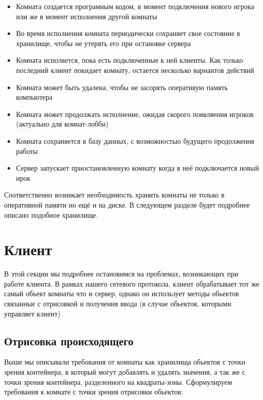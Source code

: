 \documentclass[a4paper,14pt, openany]{book}
\begin{document}
\begin {itemize}
   \item Комната создается програмным кодом, в момент подключения нового игрока или же в момент исполнения другой комнаты
   \item Во время исполнения комната периодически сохраняет свое состояние в хранилище, чтобы не утерять его при остановке сервера
   \item Комната исполяется, пока есть подключенные к ней клиенты. Как только последний клиент покидает комнату, остается несколько вариантов действий
   \item Комната может быть удалена, чтобы не засорять оперативую память компьютера 
   \item Комната может продолжать исполнение, ожидая скорого появляения игроков (актуально для комнат-лобби)
   \item Комната сохраняется в базу данных, с возможностью будущего продолжения работы
   \item Сервер запускает приостановленную комнату когда в неё подключается новый ирок
\end{itemize}

Соответственно возникает необходимость хранить комнаты не только в оперативной памяти но ещё и на диске. В следующем разделе будет подробнее описано подобное хранилище.

\section {Клиент}

В этой секции мы подробнее остановимся на проблемах, возникающих при работе клиента. В рамках нашего сетевого протокола, клиент обрабатывает тот же самый обьект комнаты что и сервер, однако он использует методы обьектов связанные с отрисовкой и получения ввода (в случае обьектов, которыми управляет клиент)

\subsection{Отрисовка происходящего}

Выше мы описывали требования от комнаты как хранилища обьектов с точки зрения контейнера, в который могут добавлять и удалять значения, а так же с точки зрения контейнера, разделенного на квадраты-зоны. Сформулируем требования к комнате с точки зрения отрисовки обьектов:
\end{document}
